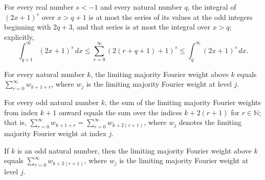 \begin{theorem}
\label{FABL.two_mul_add_one_rpow_tail_bounds}
\leanok
{}
For every real number $s<-1$ and every natural number $q$, the integral of $(2x+1)^s$
over $x>q+1$ is at most the series of its values at the odd integers beginning with
$2q+3$, and that series is at most the integral over $x>q$; explicitly,
\[\int_{q+1}^{\infty}(2x+1)^s\,dx\leq\sum_{r=0}^{\infty}(2(r+q+1)+1)^s\leq\int_q^{\infty}(2x+1)^s\,dx.\]
\end{theorem}

\begin{theorem}
\label{FABL.limitingMajorityFourierWeightAbove_eq_shifted_tsum}
\leanok
{}
For every natural number $k$, the limiting majority Fourier weight above $k$ equals
$\sum_{r=0}^{\infty} w_{k+1+r}$, where $w_j$ is the limiting majority Fourier weight at
level $j$.
\end{theorem}

\begin{theorem}
\label{FABL.shifted_limitingMajorityFourierWeight_tsum_eq_odd}
\leanok
{}
For every odd natural number $k$, the sum of the limiting majority Fourier weights from
index $k+1$ onward equals the sum over the indices $k+2(r+1)$ for $r\in\mathbb{N}$; that
is, $\sum_{r=0}^{\infty} w_{k+1+r}=\sum_{r=0}^{\infty} w_{k+2(r+1)}$, where $w_j$
denotes the limiting majority Fourier weight at index $j$.
\end{theorem}

\begin{theorem}
\label{FABL.limitingMajorityFourierWeightAbove_eq_tsum_odd}
\leanok
{}
If $k$ is an odd natural number, then the limiting majority Fourier weight above $k$
equals $\sum_{r=0}^{\infty} w_{k+2(r+1)}$, where $w_j$ is the limiting majority Fourier
weight at level $j$.
\end{theorem}

